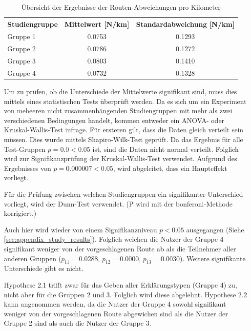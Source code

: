 \begin{table}
    \centering
    \begin{tabular}{|l|c|c|}
        \hline
        \textbf{Studiengruppe}  & \textbf{Mittelwert} [N/km] & \textbf{Standardabweichung} [N/km]\\ \hline
        Gruppe 1                & 0.0753 & 0.1293 \\ \hline
        Gruppe 2                & 0.0786 & 0.1272 \\ \hline
        Gruppe 3                & 0.0803 & 0.1410 \\ \hline
        Gruppe 4                & 0.0732 &  0.1328 \\ \hline
    \end{tabular}
    \caption{Übersicht der Ergebnisse der Routen-Abweichungen pro Kilometer}
    \label{tab:study_offroute_results}
\end{table}

Um zu prüfen, ob die Unterschiede der Mittelwerte signifikant sind, muss dies mittels eines statistischen Tests überprüft werden. Da es sich um ein Experiment von meheeren nicht zusammenhängenden Studiengruppen mit mehr als zwei verschiedenen Bedingungen handelt, kommen entweder ein ANOVA- oder Kruskal-Wallis-Test infrage. Für ersteren gilt, dass die Daten gleich verteilt sein müssen. Dies wurde mittels Shapiro-Wilk-Test geprüft. Da das Ergebnis für alle Test-Gruppen $ p = 0.0 < 0.05 $ ist, sind die Daten nicht normal verteilt. Folglich wird zur Signifikanzprüfung der Kruskal-Wallis-Test verwendet. Aufgrund des Ergebnisses von $ p = 0.000007 < 0.05 $, wird abgeleitet, dass ein Haupteffekt vorliegt.

Für die Prüfung zwischen welchen Studiengruppen ein signifikanter Unterschied vorliegt, wird der Dunn-Test \cite{dunn1964multiple} verwendet. (P wird mit der \glqq bonferoni\grqq{}-Methode korrigiert.)

Auch hier wird wieder von einem Signifikanzniveau $ p < 0.05 $ ausgegangen (Siehe \autoref{sec:appendix_study_results}). Folglich weichen die Nutzer der Gruppe 4 signifikant weniger von der vorgeschlagenen Route ab als die Teilnehmer aller anderen Gruppen ($ p_{11} = 0.0288 $, $ p_{12} = 0.0000 $, $ p_{13} = 0.0030 $). Weitere signifikante Unterschiede gibt es nicht.

Hypothese 2.1 trifft zwar für das Geben aller Erklärungstypen (Gruppe 4) zu, nicht aber für die Gruppen 2 und 3. Folglich wird diese abgelehnt. Hypothese 2.2 kann angenommen werden, da die Nutzer der Gruppe 4 sowohl signifikant weniger von der vorgeschlagenen Route abgewichen sind als die Nutzer der Gruppe 2 sind als auch die Nutzer der Gruppe 3.

